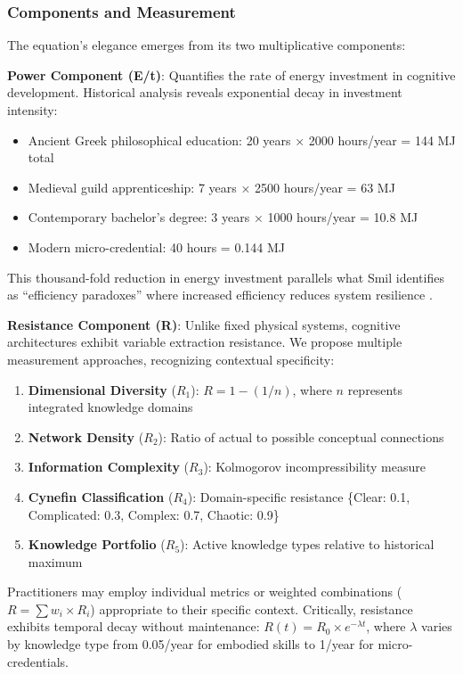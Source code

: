 \subsubsection{Components and Measurement}

The equation's elegance emerges from its two multiplicative components:

\textbf{Power Component (E/t)}: Quantifies the rate of energy investment in cognitive development. Historical analysis reveals exponential decay in investment intensity:
\begin{itemize}
\item Ancient Greek philosophical education: 20 years × 2000 hours/year = 144 MJ total
\item Medieval guild apprenticeship: 7 years × 2500 hours/year = 63 MJ
\item Contemporary bachelor's degree: 3 years × 1000 hours/year = 10.8 MJ
\item Modern micro-credential: 40 hours = 0.144 MJ
\end{itemize}

This thousand-fold reduction in energy investment parallels what Smil identifies as ``efficiency paradoxes'' where increased efficiency reduces system resilience \citep{smil2018}.

\textbf{Resistance Component (R)}: Unlike fixed physical systems, cognitive architectures exhibit variable extraction resistance. We propose multiple measurement approaches, recognizing contextual specificity:

\begin{enumerate}
\item \textbf{Dimensional Diversity} ($R_1$): $R = 1 - (1/n)$, where $n$ represents integrated knowledge domains
\item \textbf{Network Density} ($R_2$): Ratio of actual to possible conceptual connections
\item \textbf{Information Complexity} ($R_3$): Kolmogorov incompressibility measure
\item \textbf{Cynefin Classification} ($R_4$): Domain-specific resistance \{Clear: 0.1, Complicated: 0.3, Complex: 0.7, Chaotic: 0.9\}
\item \textbf{Knowledge Portfolio} ($R_5$): Active knowledge types relative to historical maximum
\end{enumerate}

Practitioners may employ individual metrics or weighted combinations ($R = \sum w_i \times R_i$) appropriate to their specific context. Critically, resistance exhibits temporal decay without maintenance: $R(t) = R_0 \times e^{-\lambda t}$, where $\lambda$ varies by knowledge type from 0.05/year for embodied skills to 1/year for micro-credentials.

